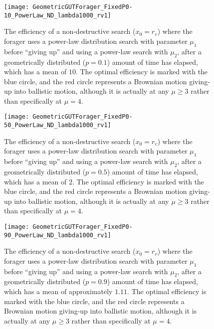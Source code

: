 \begin{figure}[h!]
\centering
\texttt{[image: GeometricGUTForager\_FixedP0-10\_PowerLaw\_ND\_lambda1000\_rv1]}
\caption[Efficiency of two-state Markov-modulated power-law strategy, with giving-up parameter $p=0.1$, for non-destructive foraging]{The efficiency of a non-destructive search ($x_0=r_v$) where the forager uses a power-law distribution search with parameter $\mu_1$ before ``giving up'' and using a power-law search with $\mu_2$, after a geometrically distributed ($p=0.1$) amount of time has elapsed, which has a mean of $10$. The optimal efficiency is marked with the blue circle, and the red circle represents a Brownian motion giving-up into ballistic motion, although it is actually at any $\mu \geq 3$ rather than specifically at $\mu =4$. \label{fig:GeometricGUTForager_PowerLaw_ND_p0.1}}
\end{figure}

\begin{figure}[h!]
	\centering
	\texttt{[image: GeometricGUTForager\_FixedP0-50\_PowerLaw\_ND\_lambda1000\_rv1]}
	\caption[Efficiency of two-state Markov-modulated power-law strategy, with giving-up parameter $p=0.5$, for non-destructive foraging]{The efficiency of a non-destructive search ($x_0=r_v$) where the forager uses a power-law distribution search with parameter $\mu_1$ before ``giving up'' and using a power-law search with $\mu_2$, after a geometrically distributed ($p=0.5$) amount of time has elapsed, which has a mean of $2$. The optimal efficiency is marked with the blue circle, and the red circle represents a Brownian motion giving-up into ballistic motion, although it is actually at any $\mu \geq 3$ rather than specifically at $\mu =4$. \label{fig:GeometricGUTForager_PowerLaw_ND_p0.5}}
\end{figure}

\begin{figure}[h!]
	\centering
	\texttt{[image: GeometricGUTForager\_FixedP0-90\_PowerLaw\_ND\_lambda1000\_rv1]}
	\caption[Efficiency of two-state Markov-modulated power-law strategy, with giving-up parameter $p=0.9$, for non-destructive foraging]{The efficiency of a non-destructive search ($x_0=r_v$) where the forager uses a power-law distribution search with parameter $\mu_1$ before ``giving up'' and using a power-law search with $\mu_2$, after a geometrically distributed ($p=0.9$) amount of time has elapsed, which has a mean of approximately $1.11$. The optimal efficiency is marked with the blue circle, and the red circle represents a Brownian motion giving-up into ballistic motion, although it is actually at any $\mu \geq 3$ rather than specifically at $\mu =4$. \label{fig:GeometricGUTForager_PowerLaw_ND_p0.9}}
\end{figure}

